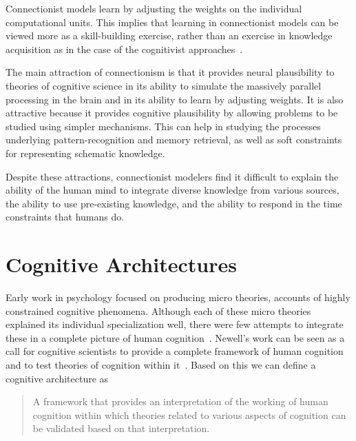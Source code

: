      Connectionist models learn by adjusting the weights on the
     individual computational units. This implies that learning in
     connectionist models can be viewed more as a skill-building
     exercise, rather than an exercise in knowledge acquisition as in
     the case of the cognitivist approaches~\cite{DBLP:journals/tec/VernonMS07}.
     
     The main attraction of connectionism is that it provides neural
     plausibility\cite{103009} to theories of cognitive science in its
     ability to simulate the massively parallel processing in the
     brain and in its ability to learn by adjusting weights. It is
     also attractive because it provides cognitive plausibility by
     allowing problems to be studied using simpler mechanisms. This
     can help in studying the processes underlying pattern-recognition
     and memory retrieval, as well as soft constraints for
     representing schematic knowledge.

     Despite these attractions, connectionist modelers find it
     difficult to explain the ability of the human mind to integrate
     diverse knowledge from various sources, the ability to use
     pre-existing knowledge, and the ability to respond in the time
     constraints that humans do.

     
\section{Cognitive Architectures}
Early work in psychology focused on producing micro theories, accounts
of highly constrained cognitive phenomena. Although each of these
micro theories explained its individual specialization well, there
were few attempts to integrate these in a complete picture of human
cognition~\cite{citeulike:4408336}.  Newell's work can be seen as a
call for cognitive scientists to provide a complete framework of human
cognition and to test theories of cognition within
it~\cite{Newell:1990aa, citeulike:4408336}.
%
Based on this we can define a cognitive architecture as

\begin{quote}
A framework that provides an interpretation of the working of
human cognition within which theories related to various aspects of
cognition can be validated based on that interpretation.
\end{quote}


